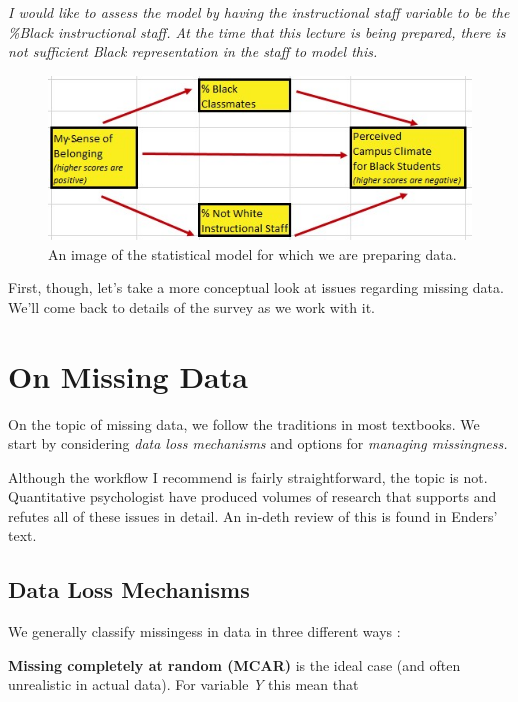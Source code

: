 \documentclass[
  english,
]{book}
\begin{document}
\emph{I would like to assess the model by having the instructional staff variable to be the \%Black instructional staff. At the time that this lecture is being prepared, there is not sufficient Black representation in the staff to model this.}

\begin{figure}
\centering
\includegraphics{images/Ch03/BlStuMod.jpg}
\caption{An image of the statistical model for which we are preparing data.}
\end{figure}

First, though, let's take a more conceptual look at issues regarding missing data. We'll come back to details of the survey as we work with it.

\hypertarget{on-missing-data}{%
\section{On Missing Data}\label{on-missing-data}}

On the topic of missing data, we follow the traditions in most textbooks. We start by considering \emph{data loss mechanisms} and options for \emph{managing missingness.}

Although the workflow I recommend is fairly straightforward, the topic is not. Quantitative psychologist have produced volumes of research that supports and refutes all of these issues in detail. An in-deth review of this is found in Enders' \citep{enders_applied_2010} text.

\hypertarget{data-loss-mechanisms}{%
\subsection{Data Loss Mechanisms}\label{data-loss-mechanisms}}

We generally classify missingess in data in three different ways \citep{kline_principles_2016, parent_handling_2013}:

\textbf{Missing completely at random (MCAR)} is the ideal case (and often unrealistic in actual data). For variable \emph{Y} this mean that
\end{document}

